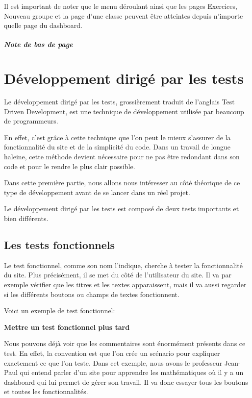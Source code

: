 \documentclass[letterpaper,10pt,french]{sphinxmanual}
\begin{document}
Il est important de noter que le menu déroulant ainsi que les pages Exercices,
Nouveau groupe et la page d'une classe peuvent être atteintes depuis n'importe
quelle page du dashboard.
\paragraph{Note de bas de page}


\chapter{Développement dirigé par les tests}
\label{tdd::doc}\label{tdd:developpement-dirige-par-les-tests}
Le développement dirigé par les tests, grossièrement traduit de l'anglais Test
Driven Development, est une technique de développement utilisée par beaucoup de
programmeurs.

En effet, c'est grâce à cette technique que l'on peut le mieux s'assurer de la
fonctionnalité du site et de la simplicité du code. Dans un travail de longue
haleine, cette méthode devient nécessaire pour ne pas être redondant dans son
code et pour le rendre le plus clair possible.

Dans cette première partie, nous allons nous intéresser au côté théorique de ce
type de développement avant de se lancer dans un réel projet.

Le développement dirigé par les tests est composé de deux tests importants et
bien différents.


\section{Les tests fonctionnels}
\label{tdd:les-tests-fonctionnels}
Le test fonctionnel, comme son nom l'indique, cherche à tester la fonctionnalité
du site. Plus précisément, il se met du côté de l'utilisateur du site. Il va par
exemple vérifier que les titres et les textes apparaissent, mais il va aussi
regarder si les différents boutons ou champs de textes fonctionnent.

Voici un exemple de test fonctionnel:

\textbf{Mettre un test fonctionnel plus tard}

Nous pouvons déjà voir que les commentaires sont énormément présents dans ce
test. En effet, la convention est que l'on crée un scénario pour expliquer
exactement ce que l'on teste. Dans cet exemple, nous avons le professeur
Jean-Paul qui entend parler d'un site pour apprendre les mathématiques où il y a
un dashboard qui lui permet de gérer son travail. Il va donc essayer
tous les boutons et toutes les fonctionnalités.
\end{document}
